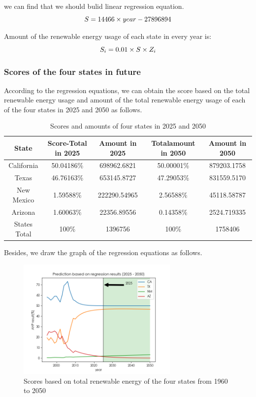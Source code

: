 \documentclass[a4paper,11pt]{article}
\begin{document}
we can find that we should bulid linear regression equation.
\begin{equation}
    \centering
S=14466 \times year-27896894
\end{equation}
\par Amount of the renewable energy usage of each state in every year is:
\begin{equation}
    \centering
    S_i=0.01 \times S \times Z_i
\end{equation}

\subsubsection{Scores of the four states in future}
\par According to the regression equations, we can obtain the score based on the total renewable energy usage and amount of the total renewable energy usage of each of the four states in 2025 and 2050 as follows.
\begin{table}[!hbp]
    \centering 
    \begin{tabular}{|c|c|c|c|c|}
\hline
State & Score-Total in 2025 & Amount in 2025 & Totalamount in 2050 & Amount in 2050\\
\hline
California & 50.04186\% & 698962.6821 & 50.00001\% & 879203.1758 \\
\hline
Texas & 46.76163\% & 653145.8727 & 47.29053\% & 831559.5170 \\
\hline
New Mexico & 1.59588\% & 222290.54965 & 2.56588\% & 45118.58787 \\
\hline
Arizona & 1.60063\% & 22356.89556 & 0.14358\% &2524.719335 \\
\hline
States Total & 100\% & 1396756 & 100\% & 1758406 \\
\hline
\end{tabular}
\caption{Scores and amounts of four states in 2025 and 2050}
\label{tab:Scores and amounts}
\end{table}
\par Besides, we draw the graph of the regression equations as follows.
\begin{figure}[h]%
    \centering 
    \includegraphics[width=0.7\textwidth]{./Pic/D-scores.png}
    \caption{Scores based on total renewable energy of the four states from 1960 to 2050}
    \label{fig:D-scores}  
\end{figure}
\end{document}
